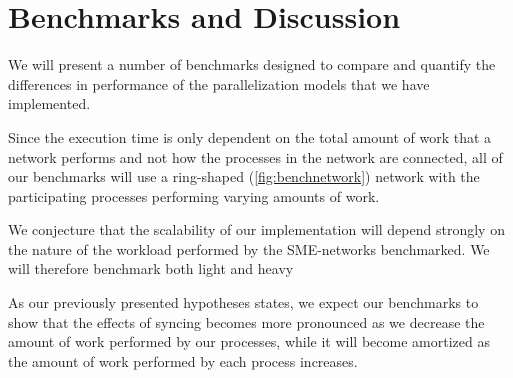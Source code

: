 \chapter{Benchmarks and Discussion}

We will present a number of benchmarks designed to compare and
quantify the differences in performance of the parallelization models
that we have implemented.

Since the execution time is only dependent on the total amount of work
that a network performs and not how the processes in the network are
connected, all of our benchmarks will use a ring-shaped
(\cref{fig:benchnetwork}) network with the participating processes
performing varying amounts of work.

We conjecture that the scalability of our implementation will depend
strongly on the nature of the workload performed by the SME-networks
benchmarked. We will therefore benchmark both light and heavy

As our previously presented hypotheses states, we expect our
benchmarks to show that the effects of syncing becomes more pronounced
as we decrease the amount of work performed by our processes, while it
will become amortized as the amount of work performed by each process
increases.

